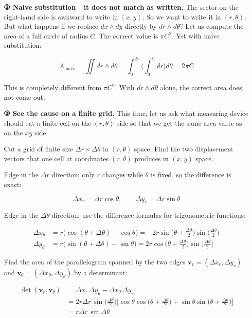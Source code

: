 \textbf{② Naive substitution—it does not match as written.} The sector
on the right-hand side is awkward to write in \((x,y)\). So we want to
write it in \((r,\theta)\). But what happens if we replace
\(dx \wedge dy\) directly by \(dr \wedge d\theta\)? Let us compute the
area of a full circle of radius \(C\). The correct value is \(\pi C^2\).
Yet with naive substitution:

\[
A_{\text{naive}}
=
\iint dr \wedge d\theta
=
\int_0^{2\pi}
\biggl(
  \int_0^C dr
\biggr)
d\theta
=
2\pi C
\]

This is completely different from \(\pi C^2\). With
\(dr \wedge d\theta\) alone, the correct area does not come out.

\textbf{③ See the cause on a finite grid.} This time, let us ask what
measuring device should eat a finite cell on the \((r,\theta)\) side so
that we get the same area value as on the \(xy\) side.

Cut a grid of finite size \(\Delta r \times \Delta\theta\) in
\((r,\theta)\) space. Find the two displacement vectors that one cell at
coordinates \((r, \theta)\) produces in \((x,y)\) space.

Edge in the \(\Delta r\) direction: only \(r\) changes while \(\theta\)
is fixed, so the difference is exact:

\[\Delta x_r = \Delta r \cos\theta,\qquad \Delta y_r = \Delta r \sin\theta\]

Edge in the \(\Delta\theta\) direction: use the difference formulas for
trigonometric functions:

\[\begin{aligned}
\Delta x_\theta &= r\bigl(\cos(\theta+\Delta\theta) - \cos\theta\bigr)
= -2r\sin\biggl(\theta+\frac{\Delta\theta}{2}\biggr)\sin\biggl(\frac{\Delta\theta}{2}\biggr) \\[4pt]
\Delta y_\theta &= r\bigl(\sin(\theta+\Delta\theta) - \sin\theta\bigr)
= 2r\cos\biggl(\theta+\frac{\Delta\theta}{2}\biggr)\sin\biggl(\frac{\Delta\theta}{2}\biggr)
\end{aligned}\]

Find the area of the parallelogram spanned by the two edges
\(\mathbf{v}_r = (\Delta x_r, \Delta y_r)\) and
\(\mathbf{v}_\theta = (\Delta x_\theta, \Delta y_\theta)\) by a
determinant:

\[\begin{aligned}
\det(\mathbf{v}_r,\mathbf{v}_\theta) &= \Delta x_r\,\Delta y_\theta - \Delta x_\theta\,\Delta y_r \\
&= 2r\Delta r\,\sin\biggl(\frac{\Delta\theta}{2}\biggr)\biggl[ \cos\theta\cos\biggl(\theta+\frac{\Delta\theta}{2}\biggr) + \sin\theta\sin\biggl(\theta+\frac{\Delta\theta}{2}\biggr) \biggr] \\
&= r\Delta r\,\sin\Delta\theta
\end{aligned}\]

